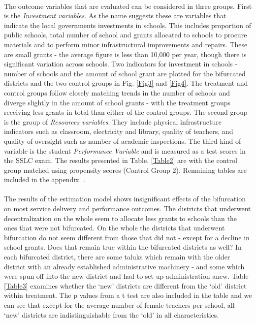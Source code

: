 \documentclass[12pt, a4paper]{article}
\begin{document}
\paragraph{} The outcome variables that are evaluated can be considered in three groups. First is the \textit{Investment variables}. As the name suggests these are variables that indicate the local governments investments in schools. This includes proportion of public schools, total number of school and grants allocated to schools to procure materials and to perform minor infrastructural improvements and repairs. These are small grants - the average figure is less than 10,000 per year, though there is significant variation across schools. Two indicators for investment in schools - number of schools and the amount of school grant are plotted for the bifurcated districts and the two control groups in Fig. \ref{Fig3} and \ref{Fig4}. The treatment and control groups follow closely matching trends in the number of schools and diverge slightly in the amount of school grants - with the treatment groups receiving less grants in total than either of the control groups. The second group is the group of \textit{Resources variables}. They include physical infrastructure indicators such as classroom, electricity and library, quality of teachers, and quality of oversight such as number of academic inspections. The third kind of variable is the student \textit{Performance Variable} and is measured as a test scores in the SSLC exam. The results presented in Table. \ref{Table2} are with the control group matched using propensity scores (Control Group 2). Remaining tables are included in the appendix.
\nocite{hinnerich2009merging} \nocite{jordahl2010merged} \nocite{reingewertz2012municipal} \nocite{blesse2013municipal}. 

\paragraph{} The results of the estimation model shows insignificant effects of the bifurcation on most service delivery and performance outcomes. The districts that underwent decentralization on the whole seem to allocate less grants to schools than the ones that were not bifurcated. On the whole the districts that underwent bifurcation do not seem different from those that did not - except for a decline in school grants. Does that remain true within the bifurcated districts as well? In each bifurcated district, there are some taluks which remain with the older district with an already established administrative machinery - and some which were spun off into the new district and had to set up administration anew. Table \ref{Table3} examines whether the `new' districts are different from the `old' district within treatment. The p values from a t test are also included in the table and we can see that except for the average number of female teachers per school, all `new' districts are indistinguishable from the `old' in all characteristics. 
\end{document}
